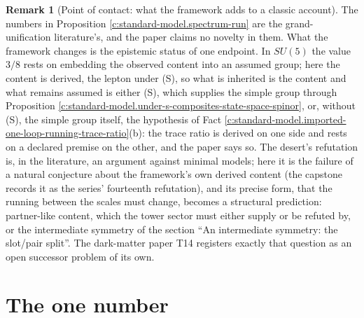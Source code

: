 \documentclass[11pt]{article}
\theoremstyle{definition}
\newtheorem{remark}[theorem]{Remark}
\theoremstyle{plain}
\begin{document}
\begin{remark}[Point of contact: what the framework adds to a classic account]\label{c:note.standard-model.point-contact-what-framework-adds-classic}
The numbers in Proposition \ref{c:standard-model.spectrum-run} are the grand-unification literature's, and the paper claims no novelty in them. What the framework changes is the epistemic status of one endpoint. In $SU(5)$ the value $3/8$ rests on embedding the observed content into an assumed group; here the content is derived, the lepton under (S), so what is inherited is the content and what remains assumed is either (S), which supplies the simple group through Proposition \ref{c:standard-model.under-s-composites-state-space-spinor}, or, without (S), the simple group itself, the hypothesis of Fact \ref{c:standard-model.imported-one-loop-running-trace-ratio}(b): the trace ratio is derived on one side and rests on a declared premise on the other, and the paper says so. The desert's refutation is, in the literature, an argument against minimal models; here it is the failure of a natural conjecture about the framework's own derived content (the capstone \cite{ButlerT17} records it as the series' fourteenth refutation), and its precise form, that the running between the scales must change, becomes a structural prediction: partner-like content, which the tower sector must either supply or be refuted by, or the intermediate symmetry of the section ``An intermediate symmetry: the slot/pair split''. The dark-matter paper T14 \cite{ButlerT14} registers exactly that question as an open successor problem of its own.
\end{remark}

\section{The one number}
\end{document}
